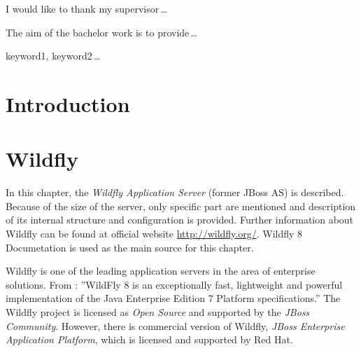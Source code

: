 \documentclass[12pt,oneside]{fithesis2}
\begin{document}
  \FrontMatter                    %
    \ThesisTitlePage                %
    \begin{ThesisDeclaration}       %
      \DeclarationText
      \AdvisorName
    \end{ThesisDeclaration}
    \begin{ThesisThanks}            %
      I would like to thank my supervisor\,\dots
    \end{ThesisThanks}
    \begin{ThesisAbstract}          %
      The aim of the bachelor work is to provide\,\dots
    \end{ThesisAbstract}
    \begin{ThesisKeyWords}          %
      keyword1, keyword2\,\dots
    \end{ThesisKeyWords}
    \tableofcontents                %
  
  \MainMatter                     %
    \chapter{Introduction}   
    
\chapter{Wildfly}
\label{wildfly_chapter}
In this chapter, the \textit{Wildfly Application Server} (former JBoss AS) is described. Because of the size of the server, only specific part are mentioned and description of its internal structure and configuration is provided. Further information about Wildfly can be found at official website \url{http://wildfly.org/}. Wildfly 8 Documetation \cite{wildfly_doc} is used as the main source for this chapter.

Wildfly is one of the leading application servers in the area of enterprise solutions. From \cite[Getting Started with WildFly 8]{wildfly_doc}: ''WildFly 8 is an exceptionally fast, lightweight and powerful implementation of the Java Enterprise Edition 7 Platform specifications.'' The Wildfly project is licensed as \textit{Open Source} and supported by the \textit{JBoss Community}. However, there is commercial version of Wildfly, \textit{JBoss Enterprise Application Platform}, which is licensed and supported by Red Hat.
\end{document}
